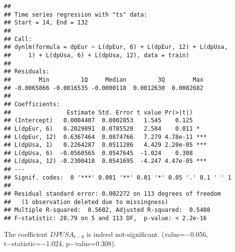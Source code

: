 \documentclass[]{article}
\newenvironment{Shaded}{\begin{snugshade}}{\end{snugshade}}
\newcommand{\DataTypeTok}[1]{\textcolor[rgb]{0.13,0.29,0.53}{#1}}
\newcommand{\DecValTok}[1]{\textcolor[rgb]{0.00,0.00,0.81}{#1}}
\newcommand{\KeywordTok}[1]{\textcolor[rgb]{0.13,0.29,0.53}{\textbf{#1}}}
\newcommand{\NormalTok}[1]{#1}
\newcommand{\OperatorTok}[1]{\textcolor[rgb]{0.81,0.36,0.00}{\textbf{#1}}}
\newcommand{\StringTok}[1]{\textcolor[rgb]{0.31,0.60,0.02}{#1}}
\begin{document}
\begin{Shaded}
\end{Shaded}

\begin{verbatim}
## 
## Time series regression with "ts" data:
## Start = 14, End = 132
## 
## Call:
## dynlm(formula = dpEur ~ L(dpEur, 6) + L(dpEur, 12) + L(dpUsa, 
##     1) + L(dpUsa, 6) + L(dpUsa, 12), data = train)
## 
## Residuals:
##        Min         1Q     Median         3Q        Max 
## -0.0065866 -0.0016535 -0.0000118  0.0012630  0.0082682 
## 
## Coefficients:
##                Estimate Std. Error t value Pr(>|t|)    
## (Intercept)   0.0004407  0.0002853   1.545    0.125    
## L(dpEur, 6)   0.2029891  0.0785520   2.584    0.011 *  
## L(dpEur, 12)  0.6367464  0.0874766   7.279 4.78e-11 ***
## L(dpUsa, 1)   0.2264287  0.0511286   4.429 2.20e-05 ***
## L(dpUsa, 6)  -0.0560565  0.0547645  -1.024    0.308    
## L(dpUsa, 12) -0.2300418  0.0541695  -4.247 4.47e-05 ***
## ---
## Signif. codes:  0 '***' 0.001 '**' 0.01 '*' 0.05 '.' 0.1 ' ' 1
## 
## Residual standard error: 0.002272 on 113 degrees of freedom
##   (1 observation deleted due to missingness)
## Multiple R-squared:  0.5602, Adjusted R-squared:  0.5408 
## F-statistic: 28.79 on 5 and 113 DF,  p-value: < 2.2e-16
\end{verbatim}

The coefficient \(DPUSA_{t−6}\) is indeed not-significant.
(value=−0.056, t−statistic=−1.024, p−value=0.308).
\end{document}

